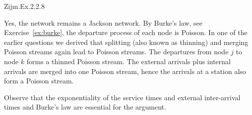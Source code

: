\begin{exercise}[\faFlask]
Zijm.Ex.2.2.8
\begin{solution}
  Yes, the network remains a Jackson network. By Burke's law, see Exercise~\ref{ex:burke}, the
  departure process of each node is Poisson. In one of the earlier
  questions we derived that splitting (also known as thinning) and
  merging Poisson streams again lead to Poisson streams. The
  departures from node $j$ to node $k$ forms a thinned Poisson
  stream. The external arrivals plus internal arrivals are merged into
  one Poisson stream, hence the arrivals at a station also form a Poisson stream.

  Observe that the exponentiality of the service times and external
  inter-arrival times and Burke's law are essential for the argument.
\end{solution}
\end{exercise}








